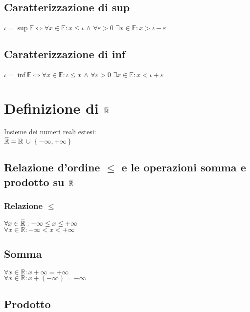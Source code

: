 \documentclass[a4paper, twoside, italian, 11pt]{book}
\newcommand{\braces}[1] {\left \{ #1 \right \}}
\newcommand{\overbar}[1] {\mkern 1.5mu\overline{\mkern-1.5mu#1\mkern-1.5mu}\mkern 1.5mu}
\newcommand{\R}{\mathbb{R}}
\newcommand{\E}{\mathbb{E}}
\begin{document}
\subsection{Caratterizzazione di sup}

\noindent
$\iota = \sup \E \iff \forall x \in \E : x \leq \iota$ $\land$ $\forall \varepsilon > 0$ $\exists x \in \E : x > \iota - \varepsilon$


\subsection{Caratterizzazione di inf}

\noindent
$\iota = \inf \E \iff \forall x \in \E : \iota \leq x$ $\land$ $\forall \varepsilon > 0$ $\exists x \in \E : x < \iota + \varepsilon$



\section{Definizione di $\overbar\R$}

\noindent
Insieme dei numeri reali estesi: \\
$\overbar\R = \R$ $\cup$ $\braces{-\infty, +\infty}$


\subsection {Relazione d'ordine $\leq$ e le operazioni somma e prodotto su $\overbar\R$}


\subsubsection{Relazione $\leq$}

\noindent
$\forall x \in \overbar\R: -\infty \leq x \leq +\infty$ \\
$\forall x \in \R: -\infty < x < +\infty$


\subsection{Somma}

\noindent
$\forall x \in \R: x + \infty = +\infty$ \\
$\forall x \in \R: x + (-\infty) = -\infty$


\subsection{Prodotto}
\end{document}
